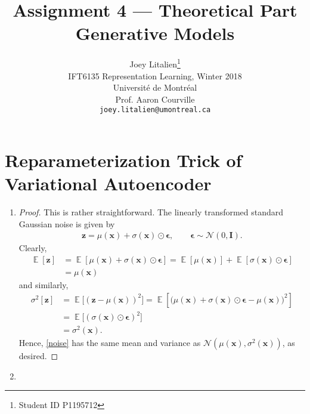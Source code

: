 \documentclass[table]{article}
\title{Assignment 4 --- Theoretical Part \\
Generative Models}
\author{Joey Litalien\thanks{Student ID P1195712} \\
IFT6135 Representation Learning, Winter 2018\\
Universit\'e de Montr\'eal\\
Prof. Aaron Courville \\
\texttt{joey.litalien@umontreal.ca}}
\def\*#1{\mathbf{#1}}
\DeclareMathOperator{\ex}{\mathbb{E}}
\begin{document}
\maketitle
\thispagestyle{empty}

\section{Reparameterization Trick of Variational Autoencoder}

\begin{enumerate}[label=(\alph*)]
  \item \begin{proof}
     This is rather straightforward. The linearly transformed standard Gaussian noise is given by
     \begin{align}
       \*z = \mu(\*x) + \sigma(\*x)\odot \mathbold{\epsilon}, \qquad \mathbold{\epsilon} \sim \mathcal{N}(0, \*I). \label{noise}
     \end{align}
     Clearly, 
     \begin{align*}
       \ex[\*z] &= \ex[ \mu(\*x) + \sigma(\*x)\odot \mathbold{\epsilon}] = \ex[\mu(\*x)] + \ex[\sigma(\*x)\odot \mathbold{\epsilon}] \\ &= \mu(\*x)
      \end{align*}
      and similarly,
      \begin{align*}
        \sigma^2[\*z] &= \ex\big[(\*z - \mu(\*x))^2\big] = \ex\left[\big(\mu(\*x) + \sigma(\*x)\odot\mathbold{\epsilon} - \mu(\*x)\big)^2\right] \\
                &= \ex\big[(\sigma(\*x)\odot \mathbold{\epsilon})^2\big] \\
                &= \sigma^2(\*x).
      \end{align*}
      Hence, \eqref{noise} has the same mean and variance as $\mathcal{N}(\mu(\*x), \sigma^2(\*x))$, as desired.
    \end{proof}

	\item
\end{enumerate}
\end{document}
